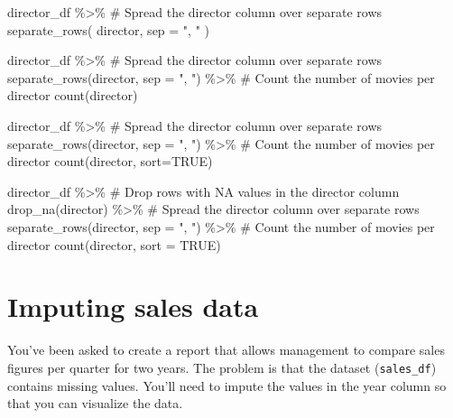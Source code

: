 \documentclass[
  letterpaper,
  DIV=11,
  numbers=noendperiod]{scrreprt}
\newenvironment{Shaded}{\begin{snugshade}}{\end{snugshade}}
\newcommand{\AttributeTok}[1]{\textcolor[rgb]{0.40,0.45,0.13}{#1}}
\newcommand{\CommentTok}[1]{\textcolor[rgb]{0.37,0.37,0.37}{#1}}
\newcommand{\ConstantTok}[1]{\textcolor[rgb]{0.56,0.35,0.01}{#1}}
\newcommand{\FunctionTok}[1]{\textcolor[rgb]{0.28,0.35,0.67}{#1}}
\newcommand{\NormalTok}[1]{\textcolor[rgb]{0.00,0.23,0.31}{#1}}
\newcommand{\SpecialCharTok}[1]{\textcolor[rgb]{0.37,0.37,0.37}{#1}}
\newcommand{\StringTok}[1]{\textcolor[rgb]{0.13,0.47,0.30}{#1}}
\begin{document}
\begin{Shaded}
\begin{Highlighting}[]
\NormalTok{director\_df }\SpecialCharTok{\%\textgreater{}\%} 
  \CommentTok{\# Spread the director column over separate rows}
  \FunctionTok{separate\_rows}\NormalTok{(}
\NormalTok{    director,}
    \AttributeTok{sep =} \StringTok{", "}
\NormalTok{  )}

\NormalTok{director\_df }\SpecialCharTok{\%\textgreater{}\%} 
  \CommentTok{\# Spread the director column over separate rows}
  \FunctionTok{separate\_rows}\NormalTok{(director, }\AttributeTok{sep =} \StringTok{", "}\NormalTok{) }\SpecialCharTok{\%\textgreater{}\%} 
  \CommentTok{\# Count the number of movies per director}
  \FunctionTok{count}\NormalTok{(director)}

\NormalTok{director\_df }\SpecialCharTok{\%\textgreater{}\%} 
  \CommentTok{\# Spread the director column over separate rows}
  \FunctionTok{separate\_rows}\NormalTok{(director, }\AttributeTok{sep =} \StringTok{", "}\NormalTok{) }\SpecialCharTok{\%\textgreater{}\%} 
  \CommentTok{\# Count the number of movies per director}
  \FunctionTok{count}\NormalTok{(director, }\AttributeTok{sort=}\ConstantTok{TRUE}\NormalTok{) }

\NormalTok{director\_df }\SpecialCharTok{\%\textgreater{}\%} 
  \CommentTok{\# Drop rows with NA values in the director column}
  \FunctionTok{drop\_na}\NormalTok{(director) }\SpecialCharTok{\%\textgreater{}\%} 
  \CommentTok{\# Spread the director column over separate rows}
  \FunctionTok{separate\_rows}\NormalTok{(director, }\AttributeTok{sep =} \StringTok{", "}\NormalTok{) }\SpecialCharTok{\%\textgreater{}\%} 
  \CommentTok{\# Count the number of movies per director}
  \FunctionTok{count}\NormalTok{(director, }\AttributeTok{sort =} \ConstantTok{TRUE}\NormalTok{)}
\end{Highlighting}
\end{Shaded}

\hypertarget{imputing-sales-data}{%
\section{Imputing sales data}\label{imputing-sales-data}}

You've been asked to create a report that allows management to compare
sales figures per quarter for two years. The problem is that the dataset
(\texttt{sales\_df}) contains missing values. You'll need to impute the
values in the year column so that you can visualize the data.
\end{document}
